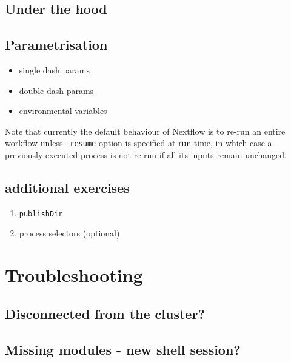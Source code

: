 \subsection {Under the hood}



\subsection{Parametrisation}

\begin{itemize}
 \item single dash params
 \item double dash params
 \item environmental variables
\end{itemize}

\begin{note}
Note that currently the default behaviour of Nextflow is to re-run an entire workflow 
unless \texttt{-resume} option is specified at run-time, in which case a previously 
executed process is not re-run if all its inputs remain unchanged.

\end{note}


\subsection{additional exercises}

\begin{enumerate}
 \item \texttt{publishDir}
 \item process selectors (optional)
\end{enumerate}


\section{Troubleshooting}

\subsection{Disconnected from the cluster?}  

\subsection{Missing modules - new shell session?}



